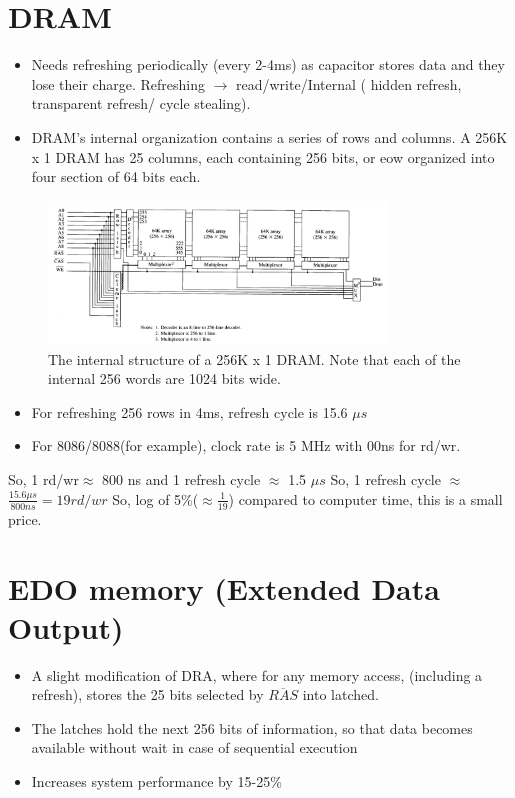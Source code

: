 \section{DRAM}
\begin{itemize}
  \item Needs refreshing periodically (every 2-4ms) as capacitor stores data and they lose their charge. Refreshing $\longrightarrow$ read/write/Internal ( hidden refresh, transparent refresh/ cycle stealing).
  \item DRAM's internal organization contains a series of rows and columns. A 256K x 1 DRAM has 25 columns, each containing 256 bits, or eow organized into four section of 64 bits each.

\end{itemize}
\begin{figure}[h!]
  \includegraphics[width = 0.8\textwidth]{./figures/DRAM2.png}
  \caption{The internal structure of a 256K x 1 DRAM. Note that each of the internal 256 words are 1024 bits wide.}
  \label{}
\end{figure}
\begin{itemize}
  \item For refreshing 256 rows in 4ms, refresh cycle is 15.6 $\mu s$
  \item For 8086/8088(for example), clock rate is 5 MHz with 00ns for rd/wr.
\end{itemize}

So, 1 rd/wr$\approx$ 800 ns and 1 refresh cycle $\approx$ 1.5 $\mu s$ \newline
So, 1 refresh cycle $\approx$ $\frac{15.6 \mu s}{800 ns} = 19 rd/wr$ \newline
So, log of 5\%($\approx \frac{1}{19}$) compared to computer time, this is a small price.

\section{EDO memory (Extended  Data Output)}
\begin{itemize}
  \item A slight modification of DRA, where for any memory access, (including a refresh), stores the 25 bits selected by $\overline{RAS}$ into latched.
  \item The latches hold the next 256 bits of information, so that data becomes available without wait in case of sequential execution
  \item Increases system performance by 15-25\%
\end{itemize}

